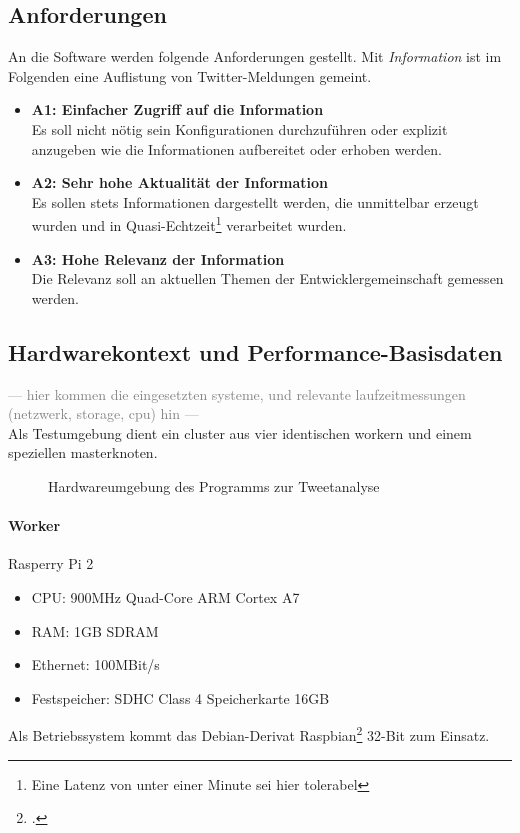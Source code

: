 \subsection{Anforderungen}

An die Software werden folgende Anforderungen gestellt. Mit \textit{Information} ist im Folgenden eine Auflistung von Twitter-Meldungen gemeint.

\begin{itemize}
	\item \textbf{A1: Einfacher Zugriff auf die Information}\\
	Es soll nicht nötig sein Konfigurationen durchzuführen oder explizit anzugeben wie die Informationen aufbereitet oder erhoben werden.
	\item \textbf{A2: Sehr hohe Aktualität der Information}\\
	Es sollen stets Informationen dargestellt werden, die unmittelbar erzeugt wurden und in Quasi-Echtzeit\footnote{Eine Latenz von unter einer Minute sei hier tolerabel} verarbeitet wurden.
	\item \textbf{A3: Hohe Relevanz der Information}\\
	Die Relevanz soll an aktuellen Themen der Entwicklergemeinschaft gemessen werden.
\end{itemize}

\subsection{Hardwarekontext und Performance-Basisdaten}
\textcolor{gray}{--- hier kommen die eingesetzten systeme, und relevante laufzeitmessungen (netzwerk, storage, cpu) hin ---}\\

Als Testumgebung dient ein \gls{cluster} aus vier identischen \gls{worker}n und einem speziellen \gls{master}knoten.

\begin{figure}[htbp]
	\centering
  
	\caption{Hardwareumgebung des Programms zur Tweetanalyse}
\end{figure}

\paragraph{Worker}
Rasperry Pi 2
\begin{itemize}
	\item CPU: 900MHz Quad-Core ARM Cortex A7
	\item RAM: 1GB SDRAM
	\item Ethernet: 100MBit/s
	\item Festspeicher: SDHC Class 4 Speicherkarte 16GB
\end{itemize}
Als Betriebssystem kommt das Debian-Derivat Raspbian\footcite{raspbian} 32-Bit zum Einsatz.

